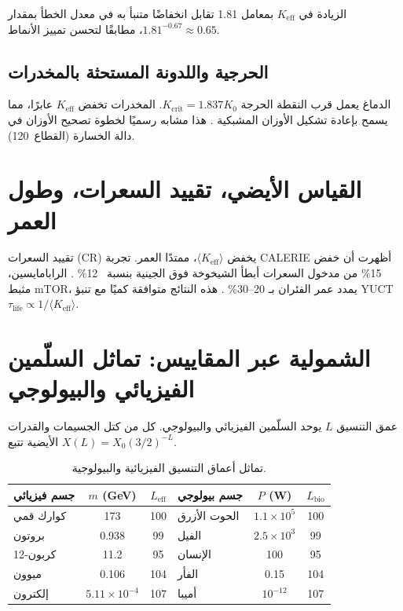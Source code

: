\documentclass[11pt,a4paper]{article}
\begin{document}
	الزيادة في \(K_{\text{eff}}\) بمعامل 1.81 تقابل انخفاضًا متنبأ به في معدل الخطأ بمقدار \(1.81^{-0.67} \approx 0.65\)، مطابقًا لتحسن تمييز الأنماط.
	
	\subsection{الحرجية واللدونة المستحثة بالمخدرات}
	
	الدماغ يعمل قرب النقطة الحرجة \(K_{\mathrm{crit}} = 1.837 K_0\). المخدرات تخفض \(K_{\text{eff}}\) عابرًا، مما يسمح بإعادة تشكيل الأوزان المشبكية \cite{CarhartHarris2018, CarhartHarris2023}. هذا مشابه رسميًا لخطوة تصحيح الأوزان في دالة الخسارة (القطاع~120).
	
	\section{القياس الأيضي، تقييد السعرات، وطول العمر}
	\label{sec:metabolism}
	
	تقييد السعرات (CR) يخفض \(\langle K_{\text{eff}} \rangle\)، ممتدًا العمر. تجربة CALERIE أظهرت أن خفض 15\% من مدخول السعرات أبطأ الشيخوخة فوق الجينية بنسبة ~12\% \cite{CALERIE2018}. الرابامايسين، مثبط mTOR، يمدد عمر الفئران بـ 20–30\% \cite{Miller2022}. هذه النتائج متوافقة كميًا مع تنبؤ YUCT \(\tau_{\text{life}} \propto 1/\langle K_{\text{eff}} \rangle\).
	
	\section{الشمولية عبر المقاييس: تماثل السلّمين الفيزيائي والبيولوجي}
	\label{sec:isomorphism}
	
	عمق التنسيق \(L\) يوحد السلّمين الفيزيائي والبيولوجي. كل من كتل الجسيمات والقدرات الأيضية تتبع \(X(L) = X_0 (3/2)^{-L}\).
	
	\begin{table}[H]
		\centering
		\caption{تماثل أعماق التنسيق الفيزيائية والبيولوجية.}
		\label{tab:isomorphism}
		\begin{tabular}{l c c l c c}
			\toprule
			\textbf{جسم فيزيائي} & \(m\) (GeV) & \(L_{\mathrm{eff}}\) & \textbf{جسم بيولوجي} & \(P\) (W) & \(L_{\mathrm{bio}}\) \\
			\midrule
			كوارك قمي & 173 & 100 & الحوت الأزرق & \(1.1\times10^5\) & 100 \\
			بروتون & 0.938 & 99 & الفيل & \(2.5\times10^3\) & 99 \\
			كربون‑12 & 11.2 & 95 & الإنسان & 100 & 95 \\
			ميوون & 0.106 & 104 & الفأر & 0.15 & 104 \\
			إلكترون & \(5.11\times10^{-4}\) & 107 & أميبا & \(10^{-12}\) & 107 \\
			\bottomrule
		\end{tabular}
	\end{table}
	
\end{document}
